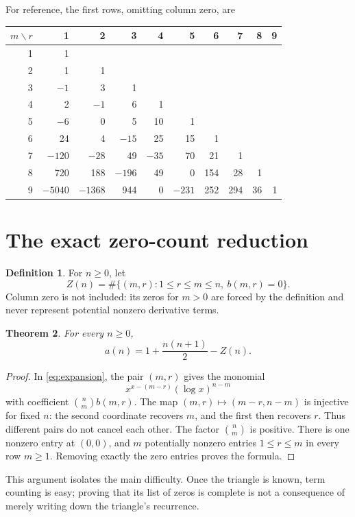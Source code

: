 \documentclass[11pt,a4paper]{article}
\numberwithin{equation}{section}
\newtheorem{theorem}{Theorem}[section]
\theoremstyle{definition}
\newtheorem{definition}[theorem]{Definition}
\theoremstyle{remark}
\begin{document}
For reference, the first rows, omitting column zero, are
\begin{center}
\setlength{\tabcolsep}{4pt}
\small
\begin{tabular}{r|rrrrrrrrr}
$m\backslash r$&1&2&3&4&5&6&7&8&9\\\hline
1&1\\
2&1&1\\
3&$-1$&3&1\\
4&2&$-1$&6&1\\
5&$-6$&0&5&10&1\\
6&24&4&$-15$&25&15&1\\
7&$-120$&$-28$&49&$-35$&70&21&1\\
8&720&188&$-196$&49&0&154&28&1\\
9&$-5040$&$-1368$&944&0&$-231$&252&294&36&1
\end{tabular}
\end{center}

\section{The exact zero-count reduction}

\begin{definition}
For $n\ge0$, let
\[
 Z(n)=\#\{(m,r):1\le r\le m\le n,\ b(m,r)=0\}.
\]
Column zero is not included: its zeros for $m>0$ are forced by the definition
and never represent potential nonzero derivative terms.
\end{definition}

\begin{theorem}\label{thm:count}
For every $n\ge0$,
\begin{equation}\label{eq:count}
 \boxed{\displaystyle a(n)=1+\frac{n(n+1)}2-Z(n).}
\end{equation}
\end{theorem}
\begin{proof}
In \eqref{eq:expansion}, the pair $(m,r)$ gives the monomial
\[
 x^{x-(m-r)}(\log x)^{n-m}
\]
with coefficient $\binom nm b(m,r)$. The map
$(m,r)\mapsto(m-r,n-m)$ is injective for fixed $n$: the second coordinate
recovers $m$, and the first then recovers $r$. Thus different pairs do not
cancel each other. The factor $\binom nm$ is positive. There is one nonzero
entry at $(0,0)$, and $m$ potentially nonzero entries $1\le r\le m$ in every
row $m\ge1$. Removing exactly the zero entries proves the formula.
\end{proof}

This argument isolates the main difficulty. Once the triangle is known,
term counting is easy; proving that its list of zeros is complete is not
a consequence of merely writing down the triangle's recurrence.
\end{document}
